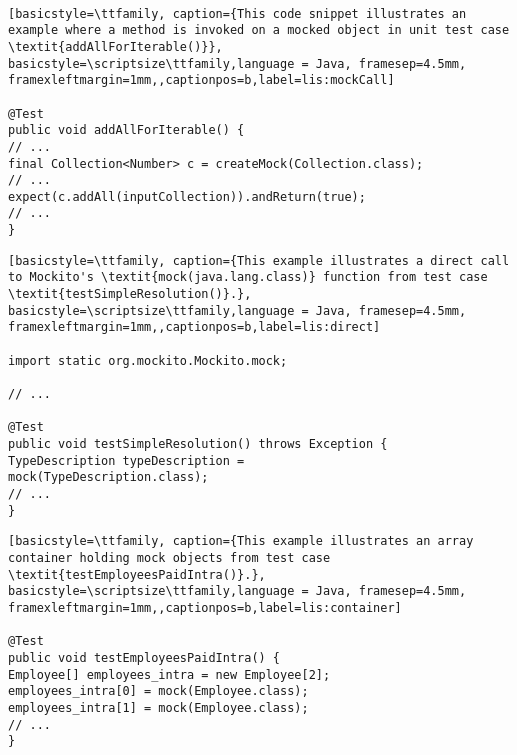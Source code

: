 ‎

\begin{lstlisting}[basicstyle=\ttfamily, caption={This code snippet illustrates an example where a method is invoked on a mocked object in unit test case \textit{addAllForIterable()}},
basicstyle=\scriptsize\ttfamily,language = Java, framesep=4.5mm,
framexleftmargin=1mm,,captionpos=b,label=lis:mockCall]

@Test
public void addAllForIterable() {
// ...
final Collection<Number> c = createMock(Collection.class);
// ...
expect(c.addAll(inputCollection)).andReturn(true);
// ...
}

\end{lstlisting}

\begin{lstlisting}[basicstyle=\ttfamily, caption={This example illustrates a direct call to Mockito's \textit{mock(java.lang.class)} function from test case \textit{testSimpleResolution()}.},
basicstyle=\scriptsize\ttfamily,language = Java, framesep=4.5mm,
framexleftmargin=1mm,,captionpos=b,label=lis:direct]

import static org.mockito.Mockito.mock;

// ...

@Test
public void testSimpleResolution() throws Exception {
TypeDescription typeDescription = 
mock(TypeDescription.class);
// ...
}

\end{lstlisting}

\begin{lstlisting}[basicstyle=\ttfamily, caption={This example illustrates an array container holding mock objects from test case \textit{testEmployeesPaidIntra()}.},
basicstyle=\scriptsize\ttfamily,language = Java, framesep=4.5mm,
framexleftmargin=1mm,,captionpos=b,label=lis:container]

@Test
public void testEmployeesPaidIntra() {
Employee[] employees_intra = new Employee[2];
employees_intra[0] = mock(Employee.class);
employees_intra[1] = mock(Employee.class);
// ...
}

\end{lstlisting}
